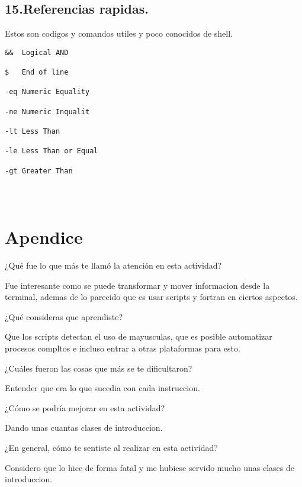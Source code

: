 \documentclass[a4paper]{article}
\begin{document}
\subsection{15.Referencias rapidas.}

Estos son codigos y comandos utiles y poco conocidos de shell.

\begin{verbatim}
&&	Logical AND

$	End of line

-eq	Numeric Equality

-ne	Numeric Inqualit

-lt	Less Than

-le	Less Than or Equal

-gt	Greater Than


\end{verbatim}



\begin{verbatim}
\end{verbatim}

\begin{verbatim}
\end{verbatim}


\section{Apendice}


¿Qué fue lo que más te llamó la atención en esta actividad?

Fue interesante como se puede transformar y mover informacion desde la terminal, ademas de lo parecido que es usar scripts y fortran en ciertos aspectos.

¿Qué consideras que aprendiste?
    
  
  
Que los scripts detectan el uso de mayusculas, que es posible automatizar procesos compltos e incluso entrar a otras plataformas para esto. 
    
   
¿Cuáles fueron las cosas que más se te dificultaron?
    
      
Entender que era lo que sucedia con cada instruccion. 
 
    
¿Cómo se podría mejorar en esta actividad?
    
    
Dando unas cuantas clases de introduccion.
   
    
¿En general, cómo te sentiste al realizar en esta actividad? 
    
     
    
    Considero que lo hice de forma fatal y me hubiese servido mucho unas clases de introduccion. 
    



\end{document}
